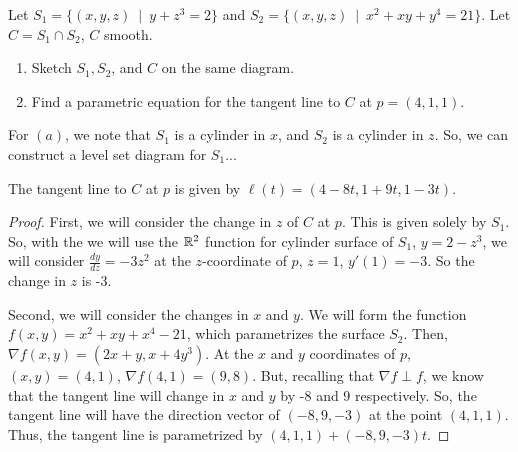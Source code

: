 \documentclass[../hw4]{subfiles}
\begin{document}
\begin{problem}[5]
Let $S_1=\{(x,y,z)\ \mid\ y + z^3=2\} $ and $S_2=\{(x,y,z)\ \mid\ x^2 + xy + y^4=21\} $. Let $C = S_1\cap S_2$, $C$ smooth.
\begin{enumerate}[label=(\alph*)]
	\item Sketch $S_1,S_2$, and $C$ on the same diagram.
	\item Find a parametric equation for the tangent line to $C$ at $p=(4,1,1)$.
\end{enumerate}
\end{problem}

For $(a)$, we note that $S_1$ is a cylinder in $x$, and  $S_2$ is a cylinder in $z$.  So, we can construct a level set diagram for $S_1$...
\begin{proposition}[b]
	The tangent line to $C$ at $p$ is given by $\ell(t)=(4-8t,1+9t,1-3t)$.
\end{proposition}
\begin{proof}
	First, we will consider the change in $z$ of $C$ at $p$. This is given solely by $S_1$.  So, with the we will use the $\mathbb{R}^2$ function for cylinder surface of $S_1$, $y=2-z^3$, we will consider $\frac{dy}{dz}=-3z^2$ at the $z$-coordinate of $p$,  $z=1$,  $y'(1)=-3$. So the change in  $z$ is -3.

	Second, we will consider the changes in $x$ and  $y$. We will form the function $f(x,y)=x^2 + xy + x^4 - 21$, which parametrizes the surface $S_2$. Then, $\nabla f(x,y) = (2x+y, x+4y^3)$. At the $x$ and  $y$ coordinates of $p$,  $(x,y)=(4,1)$,  $\nabla f(4,1) = (9,8)$. But, recalling that $\nabla f \perp f$, we know that the tangent line will change in $x$ and  $y$ by -8  and 9  respectively. So, the tangent line will have the direction vector of $(-8,9,-3)$ at the point $(4,1,1)$. Thus, the tangent line is parametrized by $(4,1,1)+(-8,9,-3)t$.
\end{proof}
\end{document}
